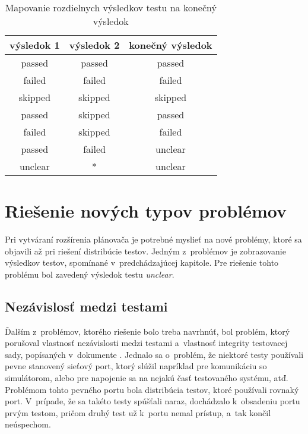 \begin{table}
  \begin{center}
    \begin{tabular}{| c | c | c |}
    \hline
    výsledok 1  & výsledok 2 & konečný výsledok \\ \hline
    passed      & passed     & passed  \\ \hline
    failed      & failed     & failed  \\ \hline
    skipped     & skipped    & skipped \\ \hline
    passed      & skipped    & passed  \\ \hline
    failed      & skipped    & failed  \\ \hline
    passed      & failed     & unclear \\ \hline
    unclear     &      *     & unclear \\ \hline
    \end{tabular}
    \caption{Mapovanie rozdielnych výsledkov testu na konečný výsledok}
    \label{tabulka:vysledky_testu_prevod}
  \end{center}
\end{table}



\section{Riešenie nových typov problémov}
\label{sekcia:riesenie_novych_problemov}
Pri vytváraní rozšírenia plánovača je potrebné myslieť na nové problémy, 
ktoré sa objavili až pri riešení distribúcie testov. 
Jedným z~problémov je zobrazovanie výsledkov testov, spomínané 
v~predchádzajúcej kapitole. Pre riešenie tohto problému bol zavedený 
výsledok testu \emph{unclear}.

\subsection*{Nezávislosť medzi testami}
Ďalším z~problémov, ktorého riešenie bolo treba navrhnúť, bol problém, 
ktorý porušoval vlastnosť nezávislosti medzi testami a~vlastnosť 
integrity testovacej sady, popísaných v~dokumente \cite{Kapfhammer}.
Jednalo sa o~problém, že niektoré testy používali pevne stanovený 
sieťový port, ktorý slúžil napríklad pre komunikáciu so simulátorom, 
alebo pre napojenie sa na nejakú časť testovaného systému, atď.
Problémom tohto pevného portu bola distribúcia testov, 
ktoré používali rovnaký port. V~prípade, že sa takéto testy spúšťali naraz, 
dochádzalo k~obsadeniu portu prvým testom, pričom druhý test 
už k~portu nemal prístup, a~tak končil neúspechom.

